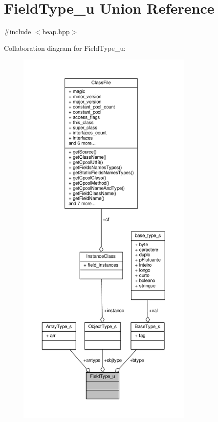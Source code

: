 \hypertarget{unionFieldType__u}{\section{Field\+Type\+\_\+u Union Reference}
\label{unionFieldType__u}
}


{\ttfamily \#include $<$heap.\+hpp$>$}



Collaboration diagram for Field\+Type\+\_\+u\+:
\nopagebreak
\begin{figure}[H]
\begin{center}
\leavevmode
\includegraphics[height=550pt]{unionFieldType__u__coll__graph}
\end{center}
\end{figure}
